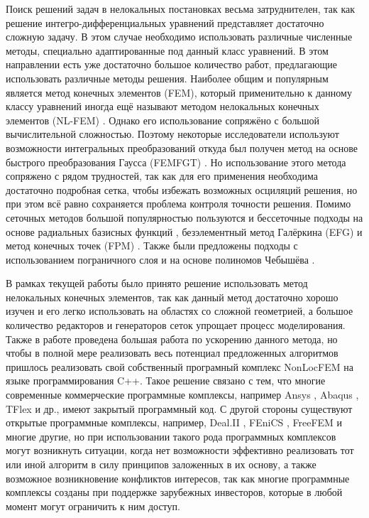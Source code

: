 \ifsynopsis
\else
Поиск решений задач в нелокальных постановках весьма затруднителен, так как решение интегро-дифференциальных уравнений представляет достаточно сложную задачу. В этом случае необходимо использовать различные численные методы, специально адаптированные под данный класс уравнений. В этом направлении есть уже достаточно большое количество работ, предлагающие использовать различные методы решения. Наиболее общим и популярным является метод конечных элементов (FEM), который применительно к данному классу уравнений иногда ещё называют методом нелокальных конечных элементов (NL-FEM) \cite{Polizzotto2, Pisano1}. Однако его использование сопряжёно с большой вычислительной сложностью. Поэтому некоторые исследователи используют возможности интегральных преобразований откуда был получен метод на основе быстрого преобразования Гаусса (FEMFGT) \cite{FastGaussTransform}. Но использование этого метода сопряжено с рядом трудностей, так как для его применения необходима достаточно подробная сетка, чтобы избежать возможных осциляций решения, но при этом всё равно сохраняется проблема контроля точности решения. Помимо сеточных методов большой популярностью пользуются и бессеточные подходы на основе радиальных базисных функций \cite{RadialBasis}, безэлементный метод Галёркина (EFG) и метод конечных точек (FPM) \cite{MeshFree}. Также были предложены подходы с использованием пограничного слоя \cite{BondaryLayer} и на основе полиномов Чебышёва \cite{ChebPolynom}.
\fi

\ifsynopsis
\else
В рамках текущей работы было принято решение использовать метод нелокальных конечных элементов, так как данный метод достаточно хорошо изучен и его легко использовать на областях со сложной геометрией, а большое количество редакторов и генераторов сеток упрощает процесс моделирования. Также в работе проведена большая работа по ускорению данного метода, но чтобы в полной мере реализовать весь потенциал предложенных алгоритмов пришлось реализовать свой собственный програмный комплекс NonLocFEM \cite{NonLocFEM} на языке программирования C++. Такое решение связано с тем, что многие современные коммерческие программные комплексы, например Ansys \cite{Ansys}, Abaqus \cite{Abaqus}, TFlex \cite{TFlex} и др., имеют закрытый программный код. С другой стороны существуют открытые программные комплексы, например, Deal.II \cite{DealII}, FEniCS \cite{FEniCS}, FreeFEM \cite{FreeFEM} и многие другие, но при использовании такого рода программных комплексов могут возникнуть ситуации, когда нет возможности эффективно реализовать тот или иной алгоритм в силу принципов заложенных в их основу, а также возможное возникновение конфликтов интересов, так как многие программные комплексы созданы при поддержке зарубежных инвесторов, которые в любой момент могут ограничить к ним доступ.
\fi

